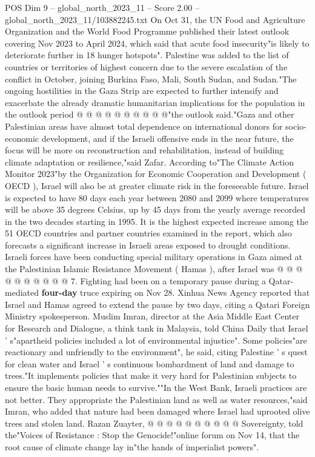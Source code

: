 \begin{textsample}{POS Dim 9 – global\_north\_2023\_11 – Score 2.00 – global\_north\_2023\_11/103882245.txt}
On Oct 31, the UN Food and Agriculture Organization and the World Food Programme published their latest outlook covering Nov 2023 to April 2024, which said that acute food insecurity"is likely to deteriorate further in 18 hunger hotspots".
Palestine was added to the list of countries or territories of highest concern due to the severe escalation of the conflict in October, joining Burkina Faso, Mali, South Sudan, and Sudan."The ongoing hostilities in the Gaza Strip are expected to further intensify and exacerbate the already dramatic humanitarian implications for the population in the outlook period @ @ @ @ @ @ @ @ @ @"the outlook said."Gaza and other Palestinian areas have almost total dependence on international donors for socio-economic development, and if the Israeli offensive ends in the near future, the focus will be more on reconstruction and rehabilitation, instead of building climate adaptation or resilience,"said Zafar.
According to"The Climate Action Monitor 2023"by the Organization for Economic Cooperation and Development ( OECD ), Israel will also be at greater climate risk in the foreseeable future.
Israel is expected to have 80 days each year between 2080 and 2099 where temperatures will be above 35 degrees Celsius, up by 45 days from the yearly average recorded in the two decades starting in 1995.
It is the highest expected increase among the 51 OECD countries and partner countries examined in the report, which also forecasts a significant increase in Israeli areas exposed to drought conditions.
Israeli forces have been conducting special military operations in Gaza aimed at the Palestinian Islamic Resistance Movement ( Hamas ), after Israel was @ @ @ @ @ @ @ @ @ @ 7.
Fighting had been on a temporary pause during a Qatar-mediated \textbf{four-day} truce expiring on Nov 28.
Xinhua News Agency reported that Israel and Hamas agreed to extend the pause by two days, citing a Qatari Foreign Ministry spokesperson.
Muslim Imran, director at the Asia Middle East Center for Research and Dialogue, a think tank in Malaysia, told China Daily that Israel ' s"apartheid policies included a lot of environmental injustice".
Some policies"are reactionary and unfriendly to the environment", he said, citing Palestine ' s quest for clean water and Israel ' s continuous bombardment of land and damage to trees."It implements policies that make it very hard for Palestinian subjects to ensure the basic human needs to survive.""In the West Bank, Israeli practices are not better.
They appropriate the Palestinian land as well as water resources,"said Imran, who added that nature had been damaged where Israel had uprooted olive trees and stolen land.
Razan Zuayter, @ @ @ @ @ @ @ @ @ @ Sovereignty, told the"Voices of Resistance : Stop the Genocide!"online forum on Nov 14, that the root cause of climate change lay in"the hands of imperialist powers".

\end{textsample}
